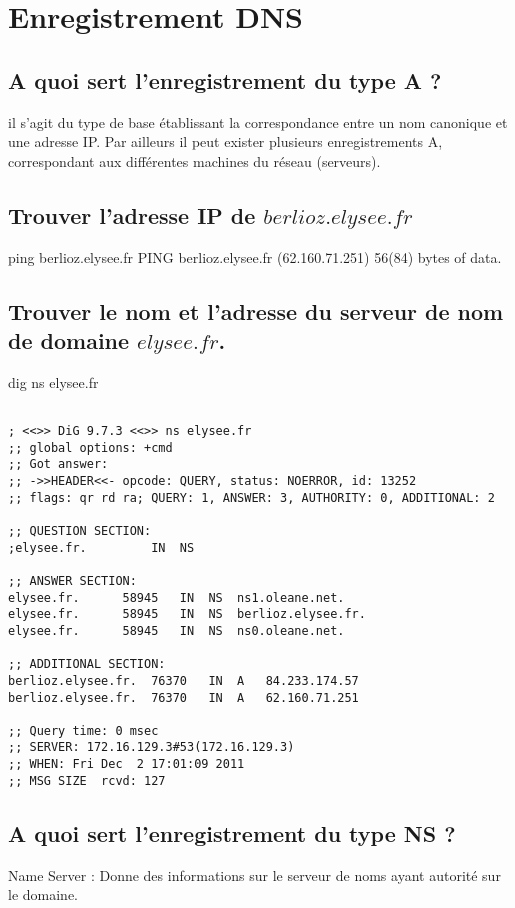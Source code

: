 \chapter{Enregistrement DNS}

\section{A quoi sert l'enregistrement du type A ?}
il s'agit du type de base établissant la correspondance entre un nom canonique et une adresse IP. Par ailleurs il peut exister plusieurs enregistrements A, correspondant aux différentes machines du réseau (serveurs). 


\section{Trouver l'adresse IP de $berlioz.elysee.fr$}
ping berlioz.elysee.fr \newline
PING berlioz.elysee.fr (62.160.71.251) 56(84) bytes of data. 

\section{Trouver le nom et l'adresse du serveur de nom de domaine $elysee.fr$.}
dig ns elysee.fr
\begin{verbatim}

; <<>> DiG 9.7.3 <<>> ns elysee.fr
;; global options: +cmd
;; Got answer:
;; ->>HEADER<<- opcode: QUERY, status: NOERROR, id: 13252
;; flags: qr rd ra; QUERY: 1, ANSWER: 3, AUTHORITY: 0, ADDITIONAL: 2

;; QUESTION SECTION:
;elysee.fr.			IN	NS

;; ANSWER SECTION:
elysee.fr.		58945	IN	NS	ns1.oleane.net.
elysee.fr.		58945	IN	NS	berlioz.elysee.fr.
elysee.fr.		58945	IN	NS	ns0.oleane.net.

;; ADDITIONAL SECTION:
berlioz.elysee.fr.	76370	IN	A	84.233.174.57
berlioz.elysee.fr.	76370	IN	A	62.160.71.251

;; Query time: 0 msec
;; SERVER: 172.16.129.3#53(172.16.129.3)
;; WHEN: Fri Dec  2 17:01:09 2011
;; MSG SIZE  rcvd: 127
\end{verbatim}

\section{A quoi sert l'enregistrement du type NS ?}
Name Server : Donne des informations sur le  serveur de noms ayant autorité sur le domaine. 

